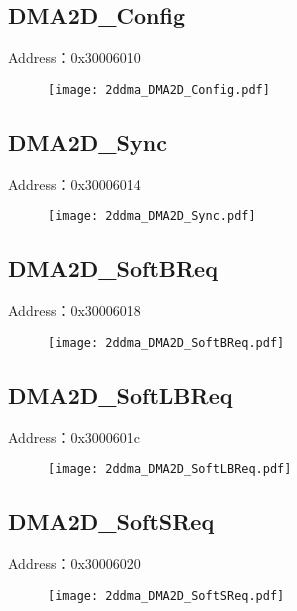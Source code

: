 \subsection{DMA2D\_Config}
\label{2ddma-DMA2D-Config}
Address：0x30006010
 \begin{figure}[H]
\texttt{[image: 2ddma\_DMA2D\_Config.pdf]}
\end{figure}

\subsection{DMA2D\_Sync}
\label{2ddma-DMA2D-Sync}
Address：0x30006014
 \begin{figure}[H]
\texttt{[image: 2ddma\_DMA2D\_Sync.pdf]}
\end{figure}

\subsection{DMA2D\_SoftBReq}
\label{2ddma-DMA2D-SoftBReq}
Address：0x30006018
 \begin{figure}[H]
\texttt{[image: 2ddma\_DMA2D\_SoftBReq.pdf]}
\end{figure}

\subsection{DMA2D\_SoftLBReq}
\label{2ddma-DMA2D-SoftLBReq}
Address：0x3000601c
 \begin{figure}[H]
\texttt{[image: 2ddma\_DMA2D\_SoftLBReq.pdf]}
\end{figure}

\subsection{DMA2D\_SoftSReq}
\label{2ddma-DMA2D-SoftSReq}
Address：0x30006020
 \begin{figure}[H]
\texttt{[image: 2ddma\_DMA2D\_SoftSReq.pdf]}
\end{figure}

